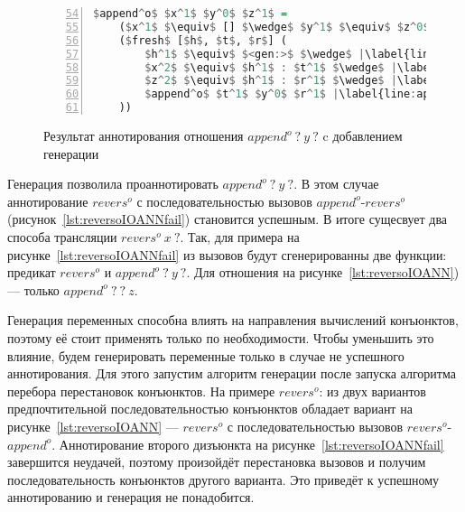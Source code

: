 \begin{figure}[h!]
  \begin{center}
  \begin{minipage}{0.4\textwidth}
  \begin{lstlisting}[language=Haskell, frame=single, numbers=left,numberstyle=\small, firstnumber=54, escapechar=|]
  $append^o$ $x^1$ $y^0$ $z^1$ =
    ($x^1$ $\equiv$ [] $\wedge$ $y^1$ $\equiv$ $z^0$) $\vee$ |\label{line:appendoOIOANN2}|
    ($fresh$ [$h$, $t$, $r$] (
        $h^1$ $\equiv$ $<gen:>$ $\wedge$ |\label{line:appendoOIOANN4}|
        $x^2$ $\equiv$ $h^1$ : $t^1$ $\wedge$ |\label{line:appendoOIOANN5}|
        $z^2$ $\equiv$ $h^1$ : $r^1$ $\wedge$ |\label{line:appendoOIOANN6}|
        $append^o$ $t^1$ $y^0$ $r^1$ |\label{line:appendoOIOANN7}|
    ))
    \end{lstlisting}
  \end{minipage}
  \end{center}
  \caption{Результат аннотирования отношения $append^o \ ? \ y \ ?$ c добавлением генерации}
  \label{lst:appendoOIOANN}
\end{figure}

Генерация позволила проаннотировать $append^o \ ? \ y \ ?$.
В этом случае аннотирование $revers^o$ с последовательностью вызовов $append^o$-$revers^o$ (рисунок~\ref{lst:reversoIOANNfail}) становится успешным.
В итоге сущесвует два способа трансляции $revers^o \ x \ ?$.
Так, для примера на рисунке~\ref{lst:reversoIOANNfail} из вызовов будут сгенерированны две функции: предикат $revers^o$ и $append^o \ ? \ y \ ?$.
Для отношения на рисунке~\ref{lst:reversoIOANN}) --- только $append^o \ ? \ ? \ z$.

Генерация переменных способна влиять на направления вычислений конъюнктов, поэтому её стоит применять только по необходимости.
Чтобы уменьшить это влияние, будем генерировать переменные только в случае не успешного аннотирования.
Для этого запустим алгоритм генерации после запуска алгоритма перебора перестановок конъюнктов.
На примере $revers^o$: из двух вариантов предпочтительной последовательностью конъюнктов обладает вариант на рисунке~\ref{lst:reversoIOANN} --- $revers^o$ с последовательностью вызовов $revers^o$-$append^o$.
Аннотирование второго дизъюнкта на рисунке~\ref{lst:reversoIOANNfail} завершится неудачей, поэтому произойдёт перестановка вызовов и получим последовательность конъюнктов другого варианта.
Это приведёт к успешному аннотированию и генерация не понадобится.
